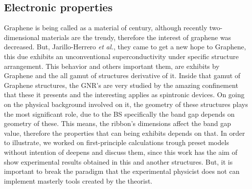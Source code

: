 \subsection{Electronic properties}
\vspace{-1cm}
Graphene is being called as a material of century, although recently two-dimensional materials are the trendy, therefore the interest of graphene was decreased. But, Jarillo-Herrero \textit{et al.}\cite{cao2018unconventional,cao2018correlated,campos2009anisotropic}, they came to get a new hope to Graphene, this due exhibits an  unconventional superconductivity under specific structure arrangement. This behavior and others important them, are exhibits by Graphene and the all gamut of structures derivative of it. Inside that gamut of Graphene structures, the GNR's are very studied by the amazing confinement that these it presents and the interesting applies as spintronic devices\cite{son2006half,kim2007recent}. On going on the physical background involved on it, the geometry of these structures plays the most significant role, due to the \gls{BS} specifically the band gap depends on geometry of these. This means, the ribbon's dimensions affect the band gap value, therefore the properties that can being exhibits depends on that\cite{son2006energy}. In order to illustrate, we worked on first-principle calculations trough preset models without intention of deepens and discuss them, since this work has the aim of show experimental results obtained in this and another structures. But, it is important to break the paradigm that the experimental physicist  does not  can implement masterly tools created by the theorist.  


